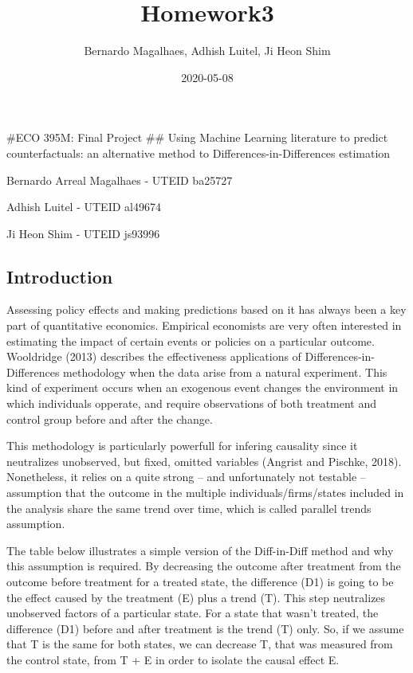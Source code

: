 \documentclass[
]{article}
\title{Homework3}
\author{Bernardo Magalhaes, Adhish Luitel, Ji Heon Shim}
\date{2020-05-08}
\begin{document}
\maketitle

\#ECO 395M: Final Project \#\# Using Machine Learning literature to
predict counterfactuals: an alternative method to
Differences-in-Differences estimation

Bernardo Arreal Magalhaes - UTEID ba25727

Adhish Luitel - UTEID al49674

Ji Heon Shim - UTEID js93996

\hypertarget{introduction}{%
\subsection{Introduction}\label{introduction}}

Assessing policy effects and making predictions based on it has always
been a key part of quantitative economics. Empirical economists are very
often interested in estimating the impact of certain events or policies
on a particular outcome. Wooldridge (2013) describes the effectiveness
applications of Differences-in-Differences methodology when the data
arise from a natural experiment. This kind of experiment occurs when an
exogenous event changes the environment in which individuals opperate,
and require observations of both treatment and control group before and
after the change.

This methodology is particularly powerfull for infering causality since
it neutralizes unobserved, but fixed, omitted variables (Angrist and
Pischke, 2018). Nonetheless, it relies on a quite strong -- and
unfortunately not testable -- assumption that the outcome in the
multiple individuals/firms/states included in the analysis share the
same trend over time, which is called parallel trends assumption.

The table below illustrates a simple version of the Diff-in-Diff method
and why this assumption is required. By decreasing the outcome after
treatment from the outcome before treatment for a treated state, the
difference (D1) is going to be the effect caused by the treatment (E)
plus a trend (T). This step neutralizes unobserved factors of a
particular state. For a state that wasn't treated, the difference (D1)
before and after treatment is the trend (T) only. So, if we assume that
T is the same for both states, we can decrease T, that was measured from
the control state, from T + E in order to isolate the causal effect E.
\end{document}
